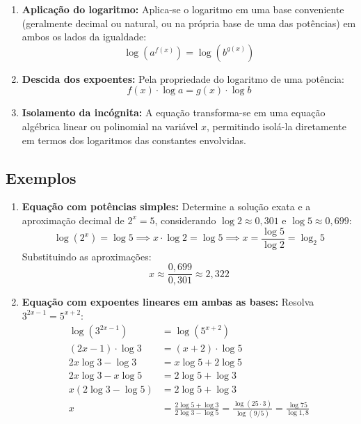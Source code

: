 \documentclass[12pt,a4paper]{report}
\begin{document}
	\begin{destaque}
		\begin{enumerate}[label=\textbf{\arabic*.}]
			\item \textbf{Aplicação do logaritmo:}  
			Aplica-se o logaritmo em uma base conveniente (geralmente decimal ou natural, ou na própria base de uma das potências) em ambos os lados da igualdade:
			$$\log(a^{f(x)}) = \log(b^{g(x)})$$
			
			\item \textbf{Descida dos expoentes:}  
			Pela propriedade do logaritmo de uma potência:
			$$f(x) \cdot \log a = g(x) \cdot \log b$$
			
			\item \textbf{Isolamento da incógnita:}  
			A equação transforma-se em uma equação algébrica linear ou polinomial na variável $x$, permitindo isolá-la diretamente em termos dos logaritmos das constantes envolvidas.
		\end{enumerate}
	\end{destaque}
	
	\subsection*{Exemplos}
	
	\begin{enumerate}[label=\textbf{\alph*)}]
		\item \textbf{Equação com potências simples:}  
		Determine a solução exata e a aproximação decimal de $2^x = 5$, considerando $\log 2 \approx 0{,}301$ e $\log 5 \approx 0{,}699$:
		$$\log(2^x) = \log 5 \implies x \cdot \log 2 = \log 5 \implies x = \frac{\log 5}{\log 2} = \log_2 5$$
		Substituindo as aproximações:
		$$x \approx \frac{0{,}699}{0{,}301} \approx 2{,}322$$
		
		\item \textbf{Equação com expoentes lineares em ambas as bases:}  
		Resolva $3^{2x - 1} = 5^{x + 2}$:
		\begin{align*}
			\log(3^{2x - 1}) &= \log(5^{x + 2}) \\
			(2x - 1) \cdot \log 3 &= (x + 2) \cdot \log 5 \\
			2x \log 3 - \log 3 &= x \log 5 + 2 \log 5 \\
			2x \log 3 - x \log 5 &= 2 \log 5 + \log 3 \\
			x(2\log 3 - \log 5) &= 2 \log 5 + \log 3 \\
			x &= \frac{2\log 5 + \log 3}{2\log 3 - \log 5} = \frac{\log(25 \cdot 3)}{\log(9 / 5)} = \frac{\log 75}{\log 1{,}8}
		\end{align*}
	\end{enumerate}
	
\end{document}
